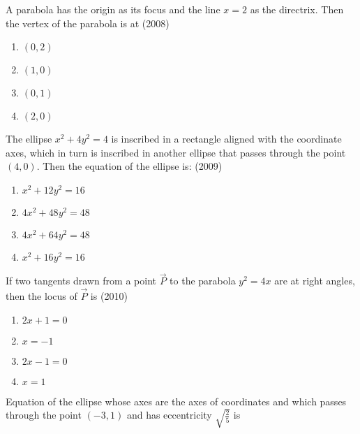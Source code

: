 \iffalse
\title{\textbf{ASSIGNMENT - 1}}
\author{\textbf{EE24BTECH11019 - Dwarak A}}
\section{mains}
\fi


    \item A parabola has the origin as its focus and the line $x=2$ as the directrix. Then the vertex of the parabola is at
    \hfill(2008)

    \begin{enumerate}
    \item$(0,2)$
    \item$(1,0)$
    \item$(0,1)$
    \item$(2,0)$ 
    \end{enumerate}
    
    \item The ellipse $x^2+4y^2=4$ is inscribed in a rectangle aligned with the coordinate axes, which in turn is inscribed in another ellipse that passes through the point $(4,0)$. Then the equation of the ellipse is:
    \hfill(2009)

    \begin{enumerate}
    \item$x^2+12y^2=16$
    \item$4x^2+48y^2=48$
    \item$4x^2+64y^2=48$
    \item$x^2+16y^2=16$ 
    \end{enumerate}

    \item If two tangents drawn from a point $\vec{P}$ to the parabola $y^2=4x$ are at right angles, then the locus of $\vec{P}$ is
    \hfill(2010)
    
    \begin{enumerate}
    \item$2x+1=0$
    \item$x=-1$
    \item$2x-1=0$
    \item$x=1$ 
    \end{enumerate}

    \item Equation of the ellipse whose axes are the axes of coordinates and which passes through the point $(-3,1)$ and has eccentricity $\sqrt{\frac{2}{5}}$ is
    
